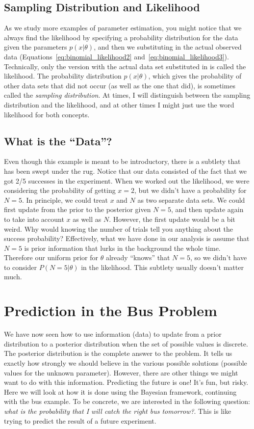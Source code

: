 \subsection{Sampling Distribution and Likelihood}
As we study more examples of parameter estimation, you might notice that
we always find the likelihood by specifying a probability distribution for
the data given the parameters $p(x|\theta)$, and then we substituting in the
actual observed data (Equations~\ref{eq:binomial_likelihood2}
and~\ref{eq:binomial_likelihood3}). Technically, only the version with the
actual data set substituted in is called the likelihood. The probability
distribution $p(x|\theta)$, which gives the probability of other data sets
that did not occur (as well as the one that did), is sometimes called the
{\it sampling distribution}. At times, I will distinguish between the sampling
distribution and the likelihood, and at other times I might just use the word
likelihood for both concepts.

\subsection{What is the ``Data''?}
Even though this example is meant to be introductory, there is a subtlety
that has been swept under the rug. Notice that our data consisted of the fact
that we got 2/5 successes in the experiment. When we worked out the likelihood,
we were considering the probability of getting $x=2$, but we didn't have a
probability for $N=5$. In principle, we could treat $x$ and $N$ as two separate data sets.
We could first update from the prior to the posterior given $N=5$, and then update
again to take into account $x$ as well as $N$. However, the first update would
be a bit weird. Why would knowing the number of trials tell you anything about
the success probability? Effectively, what we have done in our analysis is assume that $N=5$ is prior information that lurks in the background the whole time. Therefore our uniform prior for $\theta$ already ``knows''
that $N=5$, so we didn't have to consider $P(N=5|\theta)$ in the likelihood.
This subtlety usually doesn't matter much.

\section{Prediction in the Bus Problem}\label{sec:prediction_bus_problem}
We have now seen how to use information (data) to update from a prior distribution
to a posterior distribution when the set of possible values is discrete. The
posterior distribution is the complete answer to the problem. It tells us exactly
how strongly we should believe in the various possible solutions (possible
values for the unknown parameter). However, there
are other things we might want to do with this information. Predicting the future
is one! It's fun, but risky. Here we will look at how it is done using the Bayesian
framework, continuing with the bus example. To be concrete, we are interested
in the following question: {\it what is the probability that I will catch the
right bus tomorrow?}. This is like trying to predict the result of a future
experiment.

